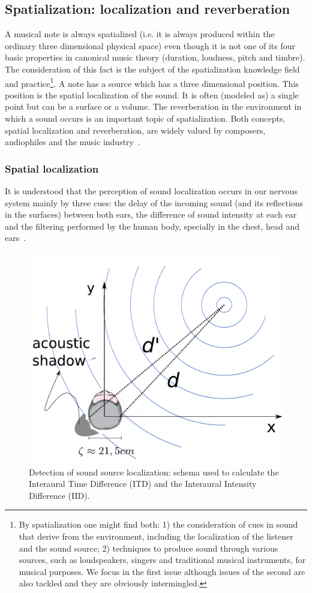 \subsection{Spatialization: localization and reverberation}\label{subsec:spac}
A musical note is always spatialized
(i.e. it is always produced within the ordinary three dimensional physical space)
even though it is not one of its four basic properties in canonical music theory (duration, loudness, pitch and timbre).
The consideration of this fact is the subject of the spatialization knowledge field and practice\footnote{By
spatialization one might find both:
1) the consideration of cues in sound that derive from the environment,
including the localization of the listener and the sound source;
2) techniques to produce sound through various sources, such as loudspeakers, singers and traditional musical instruments, for musical purposes.
We focus in the first issue although issues of the second are also tackled
and they are obviously intermingled.}.
A note has a source which has a three dimensional position.
This position is the spatial localization of the sound.
It is often (modeled as) a single point but can be a surface or a volume.
The reverberation in the environment in which a sound occurs is an important topic of spatialization.
Both concepts, spatial localization and reverberation,
are widely valued by composers, audiophiles and the music industry~\cite{floEsp}.

\subsubsection{Spatial localization}
It is understood that the perception of sound localization occurs in our nervous system
mainly by three cues: the delay of the incoming sound (and its reflections in the surfaces) between both ears,
the difference of sound intensity at each ear and the filtering performed by the human body,
specially in the chest, head and ears~\cite{Roederer, hrtf, Heeger}. 

\begin{figure}[h!]
    \centering
        \includegraphics[width=.5\textwidth]{figures/espacializacao___}
    \caption{Detection of sound source localization: schema used to calculate the Interaural Time Difference (ITD) and the Interaural Intensity Difference (IID).}
    \label{fig:spac}
\end{figure}

